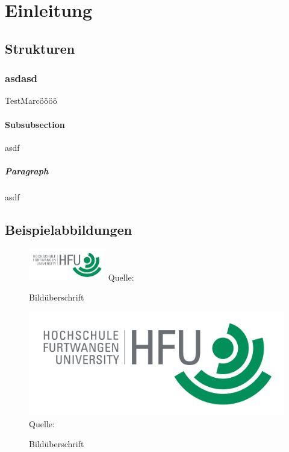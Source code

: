 \chapter{Einleitung}

\section{Strukturen}

\subsection{asdasd}
TestMarcöööö

\subsubsection{Subsubsection}
asdf

\paragraph{Paragraph}
asdf

\section{Beispielabbildungen}

\lipsum[10]

\begin{figure}
\caption{Bildüberschrift}
\centering
\includegraphics[width=0.3\textwidth]{content/pictures/hfu}
Quelle: \cite{s11wasml}
\label{pic:bild2}
\end{figure}

\lipsum[10]

\begin{figure}
\caption{Bildüberschrift}
\includegraphics[width=1\textwidth]{content/pictures/hfu}
Quelle: \cite{s11wasml}
\label{pic:bild1}
\end{figure}

